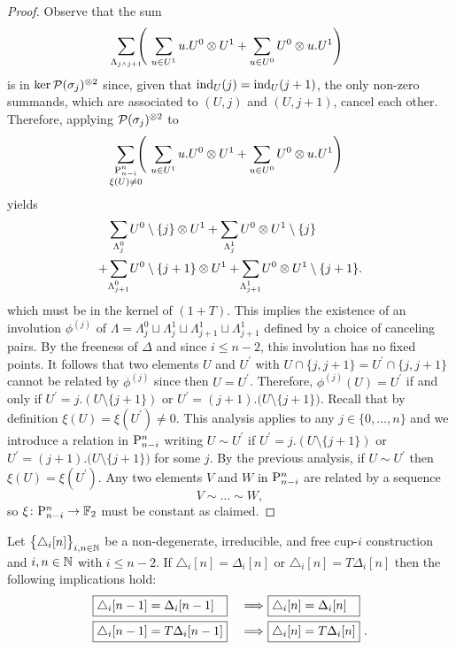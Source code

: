 \begin{proof}
	Observe that the sum
	\[
	\sum_{\mathclap{\Lambda_{j \wedge j+1}}}
	\left(\
	\sum_{u \in U^1} u.U^0 \ot U^1 +
	\sum_{u \in U^0} U^0 \ot u.U^1
	\right)
	\]
	is in $\ker \cP(\sigma_j)^{\ot 2}$ since, given that $\ind_U(j) = \ind_U(j+1)$, the only non-zero summands, which are associated to $(U,j)$ and $(U,j+1)$, cancel each other.
	Therefore, applying $\cP(\sigma_j)^{\ot 2}$ to
	\[
	\sum_{\mathclap{\substack{\P_{n-i}^n \\ \xi(U) \neq 0}}}
	\left(\
	\sum_{u \in U^1} {u.U^0} \ot U^1 +
	\sum_{u \in U^0} {U^0} \ot u.U^1
	\right)
	\]
	yields
	\begin{align*}
	&\sum_{\mathclap{\Lambda_{j}^0}} U^0 \setminus \{j\} \ot U^1	+
	\sum_{\mathclap{\Lambda_{j}^1}} U^0 \ot U^1 \setminus \{j\} \\ +
	&\sum_{\mathclap{\Lambda_{j+1}^0}} U^0 \setminus \{j+1\} \ot U^1 +
	\sum_{\mathclap{\Lambda_{j+1}^1}} U^0 \ot {U^1} \setminus \{j+1\}.
	\end{align*}
	which must be in the kernel of $(1+T)$.
	This implies the existence of an involution $\phi^{(j)}$ of $\Lambda = \Lambda^0_{j} \sqcup \Lambda^1_{j} \sqcup \Lambda^1_{j+1} \sqcup \Lambda^1_{j+1}$ defined by a choice of canceling pairs.
	By the freeness of $\Delta$ and since $i \leq n-2$, this involution has no fixed points.
	It follows that two elements $U$ and $U^\prime$ with $U \cap \{j, j+1\} = U^\prime \cap \{j, j+1\}$ cannot be related by $\phi^{(j)}$ since then $U = U^\prime$.
	Therefore, $\phi^{(j)}(U) = U^\prime$ if and only if $U^\prime = j.(U \setminus \{j+1\})$ or $U^\prime = (j+1).\big( U \setminus \{j+1\} \big)$.
	Recall that by definition $\xi(U) = \xi(U^\prime) \neq 0$.
	This analysis applies to any $j \in \{0, \dots, n\}$ and we introduce a relation in $\P_{n-i}^n$ writing $U \sim U^\prime$ if $U^\prime = j.(U \setminus \{j+1\})$ or $U^\prime = (j+1).\big( U \setminus \{j+1\} \big)$ for some $j$.
	By the previous analysis, if $U \sim U^\prime$ then $\xi(U) = \xi(U^\prime)$.
	Any two elements $V$ and $W$ in $\P_{n-i}^n$ are related by a sequence
	\[
	V \sim \dots \sim W,
	\]
	so $\xi \colon \P_{n-i}^n \to \F$ must be constant as claimed.
\end{proof}

\begin{lemma} \label{l:second nail}
	Let $\big\{ \triangle_i [n] \big\}_{i,n\in\N}$ be a non-degenerate, irreducible, and free \mbox{cup-$i$} construction and $i,n \in \N$ with $i \leq n-2$.
	If $\triangle_i [n] = \Delta_i [n]$ or $\triangle_i [n] = T \Delta_i [n]$ then the following implications hold:
	\begin{alignat*}{2}
	&\boxed{\triangle_i [n-1] = \Delta_i [n-1] \kern 7.3pt}\ &\Longrightarrow\
	&\boxed{\triangle_i [n] = \Delta_i [n] \kern 7.3pt} \\
	&\boxed{\triangle_i [n-1] = T \Delta_i [n-1]}\ &\Longrightarrow\
	&\boxed{\triangle_i [n] = T \Delta_i [n]} \ .
	\end{alignat*}
\end{lemma}

